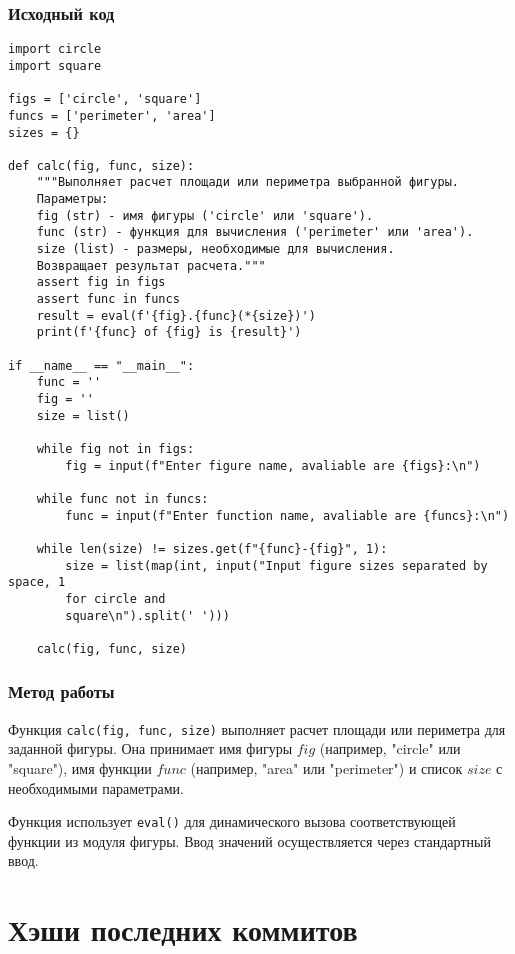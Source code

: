 \documentclass{article}
\begin{document}
\subsubsection{Исходный код}
\begin{verbatim}
import circle
import square

figs = ['circle', 'square']
funcs = ['perimeter', 'area']
sizes = {}

def calc(fig, func, size):
    """Выполняет расчет площади или периметра выбранной фигуры.
    Параметры:
    fig (str) - имя фигуры ('circle' или 'square').
    func (str) - функция для вычисления ('perimeter' или 'area').
    size (list) - размеры, необходимые для вычисления.
    Возвращает результат расчета."""
    assert fig in figs
    assert func in funcs
    result = eval(f'{fig}.{func}(*{size})')
    print(f'{func} of {fig} is {result}')

if __name__ == "__main__":
    func = ''
    fig = ''
    size = list()

    while fig not in figs:
        fig = input(f"Enter figure name, avaliable are {figs}:\n")

    while func not in funcs:
        func = input(f"Enter function name, avaliable are {funcs}:\n")

    while len(size) != sizes.get(f"{func}-{fig}", 1):
        size = list(map(int, input("Input figure sizes separated by space, 1 
        for circle and 
        square\n").split(' ')))

    calc(fig, func, size)
\end{verbatim}

\subsubsection{Метод работы}
Функция \texttt{calc(fig, func, size)} выполняет расчет площади или периметра для заданной фигуры. Она принимает имя фигуры \( fig \) (например, "circle" или "square"), имя функции \( func \) (например, "area" или "perimeter") и список \( size \) с необходимыми параметрами.

Функция использует \texttt{eval()} для динамического вызова соответствующей функции из модуля фигуры. Ввод значений осуществляется через стандартный ввод.
\newpage
\section{Хэши последних коммитов}
\end{document}
